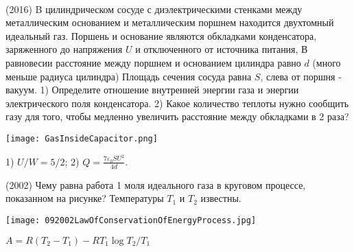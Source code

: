 \begin{ex}
\hspace{0pt} \\
\begin{minipage}{.65\textwidth}
(2016) B цилиндрическом сосуде с диэлектрическими стенками между металлическим основанием и металлическим поршнем находится двухтомный идеальный газ. Поршень и основание являются обкладками конденсатора, заряженного до напряжения $U$ и отключенного от источника питания, В равновесии расстояние между поршнем и основанием цилиндра равно $d$ (много меньше радиуса цилиндра) Площадь сечения сосуда равна $S$, слева от поршня - вакуум.
1) Определите отношение внутренней энергии газа и энергии электрического поля конденсатора. 2) Какое количество теплоты нужно сообщить газу для того, чтобы медленно увеличить расстояние между обкладками в 2 раза?
\end{minipage}
\begin{minipage}{.35\textwidth}
\centering
\texttt{[image: GasInsideCapacitor.png]}
\end{minipage}
\begin{ans}
1) $U/W=5/2$; 2) $Q=\frac{7\varepsilon_0 SU^2}{4d}$.
\end{ans}
\end{ex}

\begin{ex}
(2002) Чему равна работа 1 моля идеального газа в круговом процессе, показанном на рисунке? Температуры $T_1$ и $T_2$ известны.
\begin{center}
\texttt{[image: 092002LawOfConservationOfEnergyProcess.jpg]}
\end{center}
\begin{ans}
$A= R(T_2-T_1)-RT_1 \log T_2/T_1$
\end{ans}
\end{ex}

